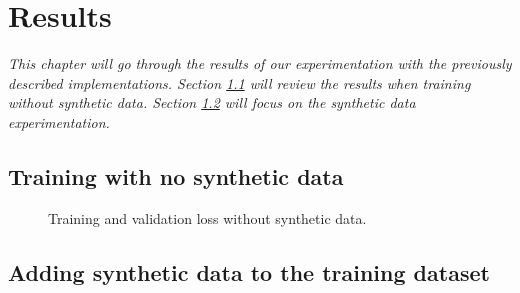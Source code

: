 
\chapter{Results}
\label{results}
\textit{This chapter will go through the results of our experimentation with the previously described implementations. Section \ref{sec:no_synt} will review the results when training without synthetic data. Section \ref{sec:with_synth} will focus on the synthetic data experimentation.}

\section{Training with no synthetic data}
\label{sec:no_synt}

\begin{figure}[h]
	\centering
	\caption{Training and validation loss without synthetic data.}
	\label{fig:loss_no_synthetic}
\end{figure}

\section{Adding synthetic data to the training dataset}
\label{sec:with_synth}